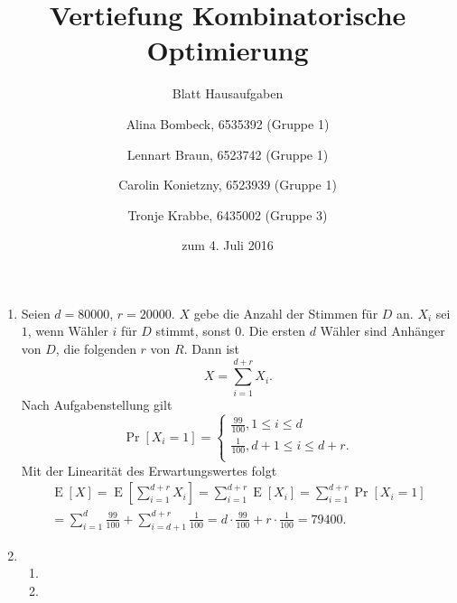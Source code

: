 \documentclass[a4paper]{scrartcl}
\title{Vertiefung Kombinatorische Optimierung}
\subtitle{Blatt {\blattnr} Hausaufgaben}
\author{%
    Alina Bombeck, 6535392 (Gruppe 1) \and
    Lennart Braun, 6523742 (Gruppe 1) \and
    Carolin Konietzny, 6523939 (Gruppe 1) \and
    Tronje Krabbe, 6435002 (Gruppe 3)
}
\date{zum 4. Juli 2016}
\DeclareMathOperator{\Pr}{Pr}
\DeclareMathOperator{\E}{E}
\begin{document}
\maketitle


\begin{enumerate}[label=\bfseries \arabic*.]
\item %
    Seien $d = \num{80000}$, $r = \num{20000}$.
    $X$ gebe die Anzahl der Stimmen für $D$ an.
    $X_i$ sei $1$, wenn Wähler $i$ für $D$ stimmt, sonst $0$.
    Die ersten $d$ Wähler sind Anhänger von $D$, die folgenden $r$ von $R$.
    Dann ist
    \begin{equation*}
        X = \sum_{i=1}^{d+r} X_i.
    \end{equation*}
    Nach Aufgabenstellung gilt
    \begin{equation*}
        \Pr[X_i = 1] =
        \begin{cases}
            \frac{99}{100}, 1 \leq i \leq d \\
            \frac{1}{100}, d+1 \leq i \leq d+r. \\
        \end{cases}
    \end{equation*}
    Mit der Linearität des Erwartungswertes folgt
    \begin{equation*}
        \begin{gathered}
            \E[X]
            = \E\left[ \sum_{i=1}^{d+r} X_i \right]
            = \sum_{i=1}^{d+r} \E[X_i]
            = \sum_{i=1}^{d+r} \Pr[X_i = 1] \\
            = \sum_{i=1}^{d} \frac{99}{100} + \sum_{i=d+1}^{d+r} \frac{1}{100}
            = d \cdot \frac{99}{100} + r \cdot \frac{1}{100}
            = \num{79400}.
        \end{gathered}
    \end{equation*}


\item %
    \begin{enumerate}
        \item
        \item
    \end{enumerate}


\end{enumerate}
\end{document}
